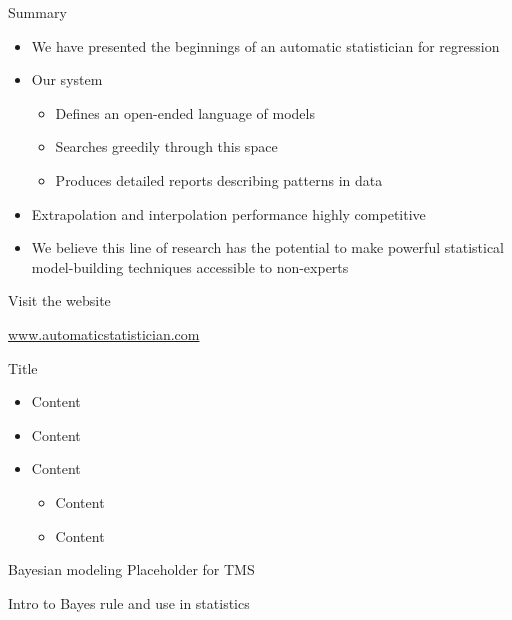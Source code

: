 \begin{frame}{Summary}
  \begin{itemize}
    \item We have presented the beginnings of an automatic statistician for regression
    \vspace{\baselineskip}
    \item Our system
    \begin{itemize}
      \item Defines an open-ended language of models
      \item Searches greedily through this space
      \item Produces detailed reports describing patterns in data
    \end{itemize}
    \vspace{\baselineskip}
    \item Extrapolation and interpolation performance highly competitive
    \vspace{\baselineskip}
    \item We believe this line of research has the potential to make powerful statistical model-building techniques accessible to non-experts
  \end{itemize}
\end{frame}

\begin{frame}{Visit the website}
  \begin{center}
    \Large
    \url{www.automaticstatistician.com}
  \end{center}
\end{frame}



\begin{frame}{Title}
  \begin{itemize}
    \item Content
    \vspace{\baselineskip}
    \item Content
    \vspace{\baselineskip}
    \item Content
    \begin{itemize}
       \item Content
       \item Content
     \end{itemize}
  \end{itemize}
\end{frame}

\begin{frame}{Bayesian modeling}
  Placeholder for TMS
  
  Intro to Bayes rule and use in statistics
\end{frame}

